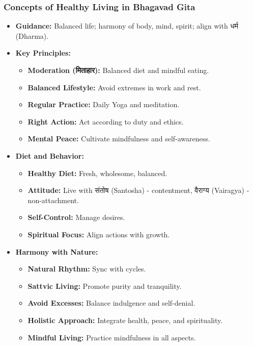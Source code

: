 \begin{frame}[fragile]\frametitle{Concepts of Healthy Living in Bhagavad Gita}

    \begin{itemize}
        \item \textbf{Guidance:} Balanced life; harmony of body, mind, spirit; align with धर्म (Dharma).
        \item \textbf{Key Principles:}
          \begin{itemize}
              \item \textbf{Moderation (मिताहार):} Balanced diet and mindful eating.
              \item \textbf{Balanced Lifestyle:} Avoid extremes in work and rest.
              \item \textbf{Regular Practice:} Daily Yoga and meditation.
              \item \textbf{Right Action:} Act according to duty and ethics.
              \item \textbf{Mental Peace:} Cultivate mindfulness and self-awareness.
          \end{itemize}
        \item \textbf{Diet and Behavior:}
          \begin{itemize}
              \item \textbf{Healthy Diet:} Fresh, wholesome, balanced.
              \item \textbf{Attitude:} Live with संतोष (Santosha) - contentment, वैराग्य (Vairagya) - non-attachment.
              \item \textbf{Self-Control:} Manage desires.
              \item \textbf{Spiritual Focus:} Align actions with growth.
          \end{itemize}
        \item \textbf{Harmony with Nature:}
          \begin{itemize}
              \item \textbf{Natural Rhythm:} Sync with cycles.
              \item \textbf{Sattvic Living:} Promote purity and tranquility.
              \item \textbf{Avoid Excesses:} Balance indulgence and self-denial.
              \item \textbf{Holistic Approach:} Integrate health, peace, and spirituality.
              \item \textbf{Mindful Living:} Practice mindfulness in all aspects.
          \end{itemize}
    \end{itemize}

\end{frame}



